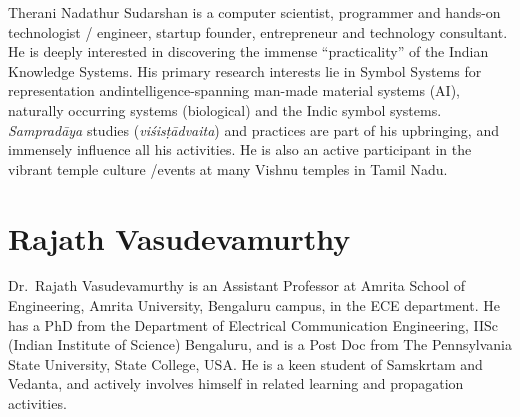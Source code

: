 Therani Nadathur Sudarshan is a computer scientist, programmer and hands-on technologist / engineer, startup founder, entrepreneur and technology consultant. He is deeply interested in discovering the immense “practicality” of the Indian Knowledge Systems. His primary research interests lie in Symbol Systems for representation and\break intelligence-spanning man-made material systems (AI), naturally occurring systems (biological) and the Indic symbol systems. {\sl Sampradāya} studies ({\sl viśisṭādvaita}) and practices are part of his upbringing, and immensely influence all his activities. He is also an active participant in the vibrant temple culture /events at many Vishnu temples in Tamil Nadu.

\section*{Rajath Vasudevamurthy}

Dr.~Rajath Vasudevamurthy is an Assistant Professor at Amrita School of Engineering, Amrita University, Bengaluru campus, in the ECE department. He has a PhD from the Department of Electrical Communication Engineering, IISc (Indian Institute of Science) Bengaluru, and is a Post Doc from The Pennsylvania State University, State College, USA. He is a keen student of Samskrtam and Vedanta, and actively involves himself in related learning and propagation activities.

